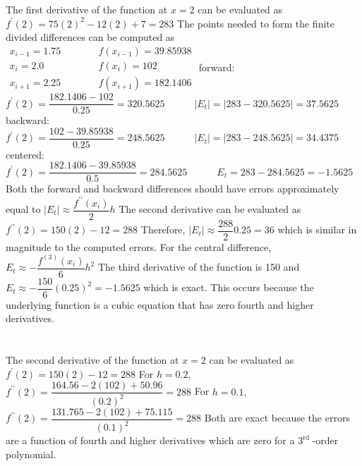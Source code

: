 \documentclass[../main.tex]{subfiles}
\begin{document}
\begin{enumerate}[label=\bfseries(\alph*)]
\section{}

The first derivative of the function at $x=2$ can be evaluated as
\bigbreak
$f^{\prime}(2)=75(2)^{2}-12(2)+7=283$
\bigbreak
The points needed to form the finite divided differences can be computed as
\bigbreak$
\begin{array}{ll}
x_{i-1}=1.75 \quad\quad\quad& f\left(x_{i-1}\right)=39.85938 \\
x_{i}=2.0\quad\quad\quad & f\left(x_{i}\right)=102 \\
x_{i+1}=2.25 \quad\quad\quad& f\left(x_{i+1}\right)=182.1406
\end{array}$
\bigbreak
forward:
\bigbreak
$f^{\prime}(2)=\dfrac{182.1406-102}{0.25}=320.5625 \quad\quad\quad\left|E_{t}\right|=|283-320.5625|=37.5625$
\bigbreak
backward:
\bigbreak
$f^{\prime}(2)=\dfrac{102-39.85938}{0.25}=248.5625 \quad\quad\quad\left|E_{t}\right|=|283-248.5625|=34.4375$
\bigbreak
centered:
\bigbreak
$f^{\prime}(2)=\dfrac{182.1406-39.85938}{0.5}=284.5625\quad\quad \quad E_{t}=283-284.5625=-1.5625$
\bigbreak
Both the forward and backward differences should have errors approximately equal to
\bigbreak
$\left|E_{t}\right| \approx \dfrac{f^{\prime \prime}\left(x_{i}\right)}{2} h$
\bigbreak
The second derivative can be evaluated as
\bigbreak
$f^{\prime \prime}(2)=150(2)-12=288$
\bigbreak
Therefore,
\bigbreak
$\left|E_{t}\right| \approx \dfrac{288}{2} 0.25=36$
\bigbreak
which is similar in magnitude to the computed errors.
\bigbreak
For the central difference,
\bigbreak
$E_{t} \approx-\dfrac{f^{(3)}\left(x_{i}\right)}{6} h^{2}$
\bigbreak
The third derivative of the function is 150 and
\bigbreak
$E_{t} \approx-\dfrac{150}{6}(0.25)^{2}=-1.5625$
\bigbreak
which is exact. This occurs because the underlying function is a cubic equation that has zero fourth and higher derivatives.
\bigbreak


\section{}
The second derivative of the function at $x=2$ can be evaluated as
\bigbreak
$f^{\prime}(2)=150(2)-12=288$
\bigbreak
For $h=0.2,$
\bigbreak
$f^{\prime \prime}(2)=\dfrac{164.56-2(102)+50.96}{(0.2)^{2}}=288$
\bigbreak
For $h=0.1,$
\bigbreak
$f^{\prime \prime}(2)=\dfrac{131.765-2(102)+75.115}{(0.1)^{2}}=288$
\bigbreak
Both are exact because the errors are a function of fourth and higher derivatives which are zero for a $3^{\text {rd }}$-order polynomial.
\bigbreak



\end{enumerate}
\end{document}
